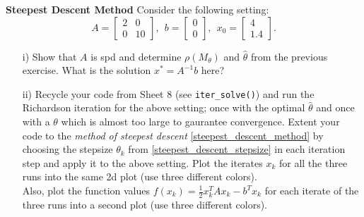 \textbf{Steepest Descent Method}
Consider the following setting: 
	$$A = 			\begin{bmatrix}
	2&0\\
	0&10
	\end{bmatrix}, ~~b = 			\begin{bmatrix}
	0\\
	0
	\end{bmatrix}, ~~x_0 = \begin{bmatrix}
	4\\
	1.4
	\end{bmatrix}.$$
	\begin{itemize}
		\item[i)] Show that $A$ is spd and determine $\rho(M_\theta)$ and $\hat{\theta}$ from the previous exercise. What is the solution $x^* = A^{-1}b$ here?
		\item[ii)] Recycle your code from Sheet 8 (see \verb|iter_solve()|) and run the Richardson iteration for the above setting; once with the optimal $\hat{\theta}$ and once with a $\theta$ which is almost too large to gaurantee convergence. Extent your code to the \textit{method of steepest descent} \eqref{steepest_descent_method} by choosing the stepsize $\theta_k$ from \eqref{steepest_descent_stepsize} in each iteration step and apply it to the above setting. Plot the iterates $x_k$ for all the three runs into the same 2d plot (use three different colors).\\ Also, plot the function values $f(x_k) = \frac{1}{2} x_k^TAx_k - b^Tx_k$ for each iterate of the three runs into a second plot (use three different colors).
	\end{itemize}